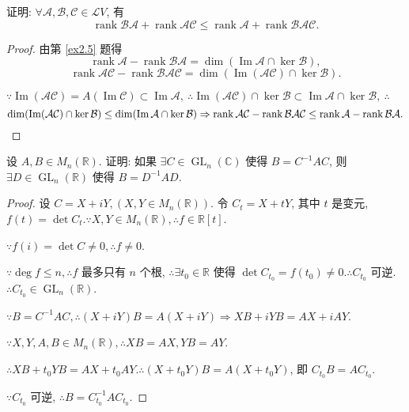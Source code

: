 \documentclass{ctexart}
\begin{document}
\begin{exercise}%
    证明: $\forall\mathcal{A},\mathcal{B},\mathcal{C}\in\mathcal{L}V$, 有
    \[\operatorname{rank}\mathcal{BA}+\operatorname{rank}\mathcal{AC}\leq\operatorname{rank}\mathcal{A}+\operatorname{rank}\mathcal{BAC}.\]
\end{exercise}
\begin{proof}
    由第 \ref{ex2.5} 题得
    \[\operatorname{rank}\mathcal{A}-\operatorname{rank}\mathcal{BA}=\dim(\operatorname{Im}\mathcal{A}\cap\ker\mathcal{B}),\]
    \[\operatorname{rank}\mathcal{AC}-\operatorname{rank}\mathcal{BAC}=\dim(\operatorname{Im}(\mathcal{AC})\cap\ker\mathcal{B}).\]

    $\because\operatorname{Im}(\mathcal{AC})=A(\operatorname{Im}\mathcal{C})\subset\operatorname{Im}\mathcal{A},\ \therefore\operatorname{Im}(\mathcal{AC})\cap\ker\mathcal{B}\subset\operatorname{Im}\mathcal{A}\cap\ker\mathcal{B},\ \therefore$
    \[\dim(\operatorname{Im}(\mathcal{AC})\cap\ker\mathcal{B})\leq\dim(\operatorname{Im}\mathcal{A}\cap\ker\mathcal{B})\Rightarrow\operatorname{rank}\mathcal{AC}-\operatorname{rank}\mathcal{BAC}\leq\operatorname{rank}\mathcal{A}-\operatorname{rank}\mathcal{BA}.\qedhere\]
\end{proof}
\begin{exercise}%
    设 $A,B\in M_n(\mathbb{R})$. 证明: 如果 $\exists C\in \operatorname{GL}_n(\mathbb{C})$ 使得 $B=C^{-1}AC$, 则 $\exists D\in \operatorname{GL}_n(\mathbb{R})$ 使得 $B=D^{-1}AD$.
\end{exercise}
\begin{proof}
    设 $C=X+iY,(X,Y\in M_n(\mathbb{R}))$. 令 $C_t=X+tY$, 其中 $t$ 是变元, $f(t)=\det C_t.\because X,Y\in M_n(\mathbb{R}),\therefore f\in\mathbb{R}[t]$.
    
    $\because f(i)=\det C\neq0,\therefore f\neq0$.

    $\because\deg f\leq n,\therefore f$ 最多只有 $n$ 个根, $\therefore\exists t_0\in\mathbb{R}$ 使得 $\det C_{t_0}=f(t_0)\neq0.\therefore C_{t_0}$ 可逆. $\therefore C_{t_0}\in \operatorname{GL}_n(\mathbb{R})$.

    $\because B=C^{-1}AC,\therefore(X+iY)B=A(X+iY)\Rightarrow XB+iYB=AX+iAY$.

    $\because X,Y,A,B\in M_n(\mathbb{R}),\therefore XB=AX,YB=AY$.

    $\therefore XB+t_0YB=AX+t_0AY.\therefore(X+t_0Y)B=A(X+t_0Y)$, 即 $C_{t_0}B=AC_{t_0}$.

    $\because C_{t_0}$ 可逆, $\therefore B=C_{t_0}^{-1}AC_{t_0}$.
\end{proof}
\end{document}
